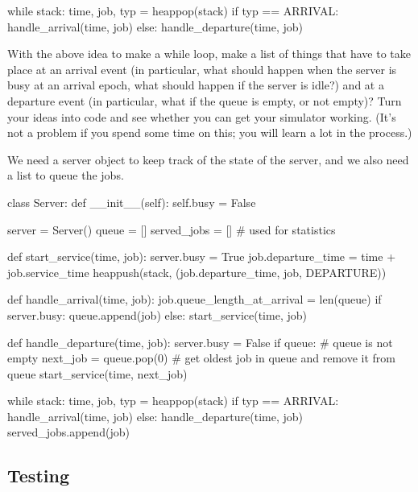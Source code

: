 \documentclass{scrartcl}
\begin{document}
  \begin{pyblock}
while stack:
    time, job, typ = heappop(stack)
    if typ == ARRIVAL:
        handle_arrival(time, job)
    else:
        handle_departure(time, job)
    
  \end{pyblock}

\begin{exercise}
  With the above idea to make a while loop, make a list of things that have to take place at an arrival event (in particular, what should happen when the server is busy at an arrival epoch, what should happen if the server is idle?)
  and at a departure event (in particular, what if the queue is empty, or not empty)?
  Turn your ideas into code and see whether you can get your simulator working.
  (It's not a problem if you spend some time on this; you will learn a lot in the process.)

\begin{solution}
We need a server object to keep track of the state of the server, and we also need  a list to queue the jobs. 

  \begin{pyblock}
class Server:
    def __init__(self):
        self.busy = False

server = Server()
queue = []
served_jobs = [] # used for statistics

def start_service(time, job):
    server.busy = True
    job.departure_time = time + job.service_time
    heappush(stack, (job.departure_time, job, DEPARTURE))

def handle_arrival(time, job):
    job.queue_length_at_arrival = len(queue)
    if server.busy:
        queue.append(job)
    else:
        start_service(time, job)
        
def handle_departure(time, job):
    server.busy = False
    if queue: # queue is not empty
        next_job = queue.pop(0) # get oldest job in queue and remove it from queue
        start_service(time, next_job)
        
while stack:
    time, job, typ = heappop(stack)
    if typ == ARRIVAL:
        handle_arrival(time, job)
    else:
        handle_departure(time, job)
        served_jobs.append(job)

  \end{pyblock}
\end{solution}

\end{exercise}

\subsection{Testing}
\label{sec:testing}
\end{document}
